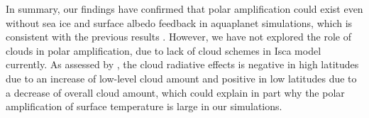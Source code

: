 In summary, our findings have confirmed that polar amplification could exist even without sea ice and surface albedo feedback in aquaplanet simulations, which is consistent with the previous results \citep{Langen2007,Kim2018,Alexeev2005}. However, we have not explored the role of clouds in polar amplification, due to lack of cloud schemes in Isca model currently. As assessed by \cite{Kim2018}, the cloud radiative effects is negative in high latitudes due to an increase of low-level cloud amount and positive in low latitudes due to a decrease of overall cloud amount, which could explain in part why the polar amplification of surface temperature is large in our simulations. 


